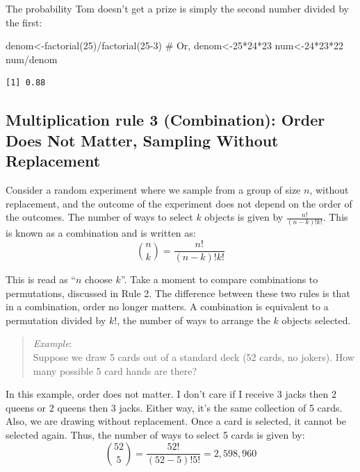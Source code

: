\documentclass[
  letterpaper,
  DIV=11,
  numbers=noendperiod]{scrreprt}
\newenvironment{Shaded}{\begin{snugshade}}{\end{snugshade}}
\newcommand{\CommentTok}[1]{\textcolor[rgb]{0.37,0.37,0.37}{#1}}
\newcommand{\DecValTok}[1]{\textcolor[rgb]{0.68,0.00,0.00}{#1}}
\newcommand{\FunctionTok}[1]{\textcolor[rgb]{0.28,0.35,0.67}{#1}}
\newcommand{\NormalTok}[1]{\textcolor[rgb]{0.00,0.23,0.31}{#1}}
\newcommand{\OtherTok}[1]{\textcolor[rgb]{0.00,0.23,0.31}{#1}}
\newcommand{\SpecialCharTok}[1]{\textcolor[rgb]{0.37,0.37,0.37}{#1}}
\begin{document}
The probability Tom doesn't get a prize is simply the second number
divided by the first:

\begin{Shaded}
\begin{Highlighting}[]
\NormalTok{denom}\OtherTok{\textless{}{-}}\FunctionTok{factorial}\NormalTok{(}\DecValTok{25}\NormalTok{)}\SpecialCharTok{/}\FunctionTok{factorial}\NormalTok{(}\DecValTok{25{-}3}\NormalTok{)}
\CommentTok{\# Or, denom\textless{}{-}25*24*23}
\NormalTok{num}\OtherTok{\textless{}{-}}\DecValTok{24}\SpecialCharTok{*}\DecValTok{23}\SpecialCharTok{*}\DecValTok{22}
\NormalTok{num}\SpecialCharTok{/}\NormalTok{denom}
\end{Highlighting}
\end{Shaded}

\begin{verbatim}
[1] 0.88
\end{verbatim}

\subsection{Multiplication rule 3 (Combination): Order Does Not Matter,
Sampling Without
Replacement}\label{multiplication-rule-3-combination-order-does-not-matter-sampling-without-replacement}

Consider a random experiment where we sample from a group of size \(n\),
without replacement, and the outcome of the experiment does not depend
on the order of the outcomes. The number of ways to select \(k\) objects
is given by \(\frac{n!} {(n-k)!k!}\). This is known as a combination and
is written as: \[
\binom{n}{k} = \frac{n!}{(n-k)!k!} 
\]

This is read as ``\(n\) choose \(k\)''. Take a moment to compare
combinations to permutations, discussed in Rule 2. The difference
between these two rules is that in a combination, order no longer
matters. A combination is equivalent to a permutation divided by \(k!\),
the number of ways to arrange the \(k\) objects selected.

\begin{quote}
\emph{Example}:\\
Suppose we draw 5 cards out of a standard deck (52 cards, no jokers).
How many possible 5 card hands are there?
\end{quote}

In this example, order does not matter. I don't care if I receive 3
jacks then 2 queens or 2 queens then 3 jacks. Either way, it's the same
collection of 5 cards. Also, we are drawing without replacement. Once a
card is selected, it cannot be selected again. Thus, the number of ways
to select 5 cards is given by: \[
\binom{52}{5} = \frac{52!}{(52-5)!5!} = 2,598,960
\]
\end{document}
